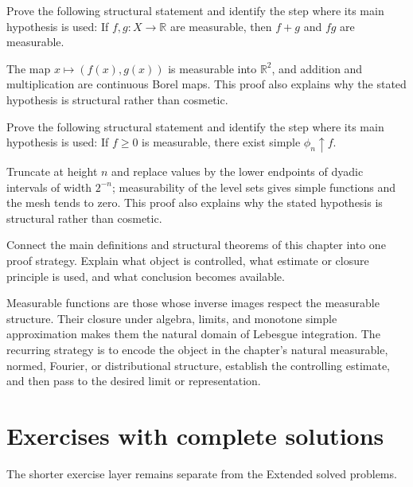 \begin{problem}\label{prob:iii02-problem-10}
Prove the following structural statement and identify the step where its main hypothesis is used: If $f,g:X\to\mathbb R$ are measurable, then $f+g$ and $fg$ are measurable.
\end{problem}
\begin{solution}
The map $x\mapsto(f(x),g(x))$ is measurable into $\mathbb R^2$, and addition and multiplication are continuous Borel maps. This proof also explains why the stated hypothesis is structural rather than cosmetic.
\end{solution}

\begin{problem}\label{prob:iii02-problem-11}
Prove the following structural statement and identify the step where its main hypothesis is used: If $f\ge0$ is measurable, there exist simple $\phi_n\uparrow f$.
\end{problem}
\begin{solution}
Truncate at height $n$ and replace values by the lower endpoints of dyadic intervals of width $2^{-n}$; measurability of the level sets gives simple functions and the mesh tends to zero. This proof also explains why the stated hypothesis is structural rather than cosmetic.
\end{solution}

\begin{problem}\label{prob:iii02-problem-12}
Connect the main definitions and structural theorems of this chapter into one proof strategy. Explain what object is controlled, what estimate or closure principle is used, and what conclusion becomes available.
\end{problem}
\begin{solution}
Measurable functions are those whose inverse images respect the measurable structure. Their closure under algebra, limits, and monotone simple approximation makes them the natural domain of Lebesgue integration. The recurring strategy is to encode the object in the chapter's natural measurable, normed, Fourier, or distributional structure, establish the controlling estimate, and then pass to the desired limit or representation.
\end{solution}
\section{Exercises with complete solutions}
The shorter exercise layer remains separate from the Extended solved problems.

